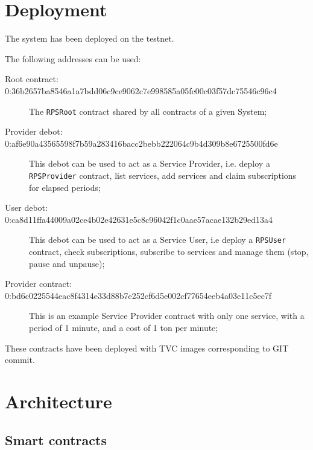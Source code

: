 \documentclass[10pt,a4paper]{article}
\begin{document}
\section{Deployment}

The system has been deployed on the testnet.

The following addresses can be used:
\begin{description}
  \item[Root contract: 0:36b2657ba8546a1a7bdd06c9ce9062c7e998585a05fc00c03f57dc75546c96c4] The {\tt RPSRoot} contract shared by all
    contracts of a given System;
  \item[Provider debot: 0:af6e90a43565598f7b59a283416bacc2bebb222064c9b4d309b8e6725500fd6e] This debot can be used to act as a
    Service Provider, i.e. deploy a {\tt RPSProvider} contract, list
    services, add services and claim subscriptions for elapsed
    periods;
  \item[User debot: 0:ca8d11ffa44009a02ce4b02e42631e5c8c96042f1c0aae57acae132b29ed13a4] This debot can be used to act as a Service
    User, i.e deploy a {\tt RPSUser} contract, check subscriptions,
    subscribe to services and manage them (stop, pause and unpause);
  \item[Provider contract: 0:bd6c0225544eac8f4314e33d88b7e252cf6d5e002cf77654eeb4a03e11c5ec7f] This is an example Service Provider
    contract with only one service, with a period of 1 minute, and a
    cost of 1 ton per minute;
    
\end{description}

These contracts have been deployed with TVC images corresponding to
GIT commit.

\section{Architecture}

\subsection{Smart contracts}
\end{document}
